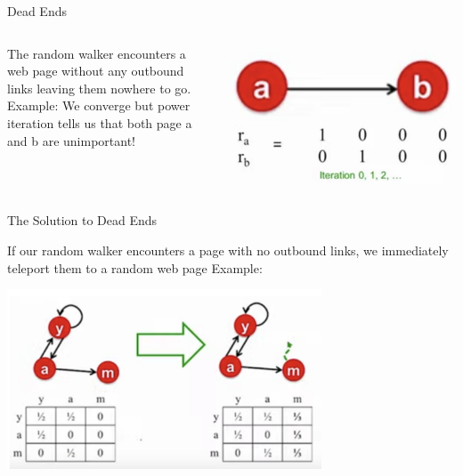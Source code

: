 \documentclass{beamer}
\begin{document}
\begin{frame}[t]{Dead Ends}
\begin{columns}
    \begin{column}{0.5\textwidth}
        \begin{outline}
            \1 The random walker encounters a web page without any outbound links leaving them nowhere to go.
            \1 Example:
            We converge but power iteration
            tells us that both page a and b are
            unimportant!
        \end{outline}
    \end{column}
    \begin{column}{0.5\textwidth}
        \includegraphics[width=\textwidth]{deadenda.png}
        \includegraphics[width=\textwidth]{deadendb.png}
    \end{column}
\end{columns}
\end{frame}
\begin{frame}[t]{The Solution to Dead Ends}
\begin{outline}
\1 If our random walker encounters a page with no outbound links, we immediately teleport them to a random web page
\1 Example:

\begin{center}
    \includegraphics[width=0.7\textwidth]{desol.png}
\end{center}
\end{outline}
\end{frame}
    
\end{document}
